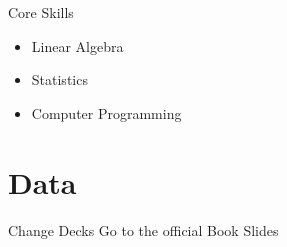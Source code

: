 \documentclass[]{beamer}
\begin{document}
\begin{frame}{Core Skills}
    \begin{itemize}[<+->]
        \item Linear Algebra
        \item Statistics
        \item Computer Programming
    \end{itemize}
\end{frame}

\section{Data}
\begin{frame}{Change Decks}
Go to the official Book Slides
\end{frame}
\end{document}
